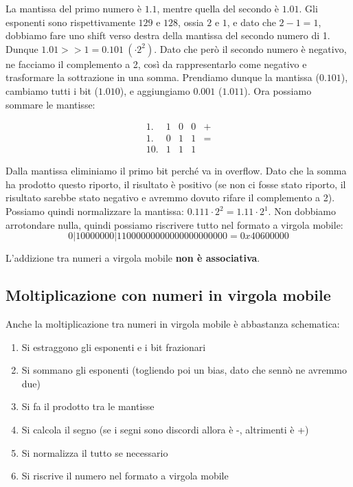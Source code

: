 \documentclass[11pt, a4paper, titlepage, oneside]{scrbook}
\begin{document}
La mantissa del primo numero è $1.1$, mentre quella del secondo è $1.01$. Gli esponenti sono rispettivamente $129$ e $128$, ossia $2$ e $1$, e dato che $2-1 = 1$, dobbiamo fare uno shift verso destra della mantissa del secondo numero di 1. Dunque $1.01 >> 1 =  0.101 \ (\cdot 2^2)$. Dato che però il secondo numero è negativo, ne facciamo il complemento a 2, così da rappresentarlo come negativo e trasformare la sottrazione in una somma. Prendiamo dunque la mantissa ($0.101$), cambiamo tutti i bit ($1.010$), e aggiungiamo $0.001$ ($1.011$). Ora possiamo sommare le mantisse:

\[
\begin{array}{rcccc}
1. & 1 & 0 & 0 & + \\
1. & 0 & 1 & 1 & = \\
\hline
1 0. & 1 & 1 & 1 &
\end{array}
\]

Dalla mantissa eliminiamo il primo bit perché va in overflow. Dato che la somma ha prodotto questo riporto, il risultato è positivo (se non ci fosse stato riporto, il risultato sarebbe stato negativo e avremmo dovuto rifare il complemento a 2). Possiamo quindi normalizzare la mantissa: $0.111 \cdot 2^2 = 1.11 \cdot 2^1$. Non dobbiamo arrotondare nulla, quindi possiamo riscrivere tutto nel formato a virgola mobile:
\[
0|10000000|11000000000000000000000 = 0x40600000
\]

\NB L'addizione tra numeri a virgola mobile \textbf{non è associativa}.

\subsection{Moltiplicazione con numeri in virgola mobile}

Anche la moltiplicazione tra numeri in virgola mobile è abbastanza schematica:
\begin{enumerate}[label=\arabic*°]
    \item Si estraggono gli esponenti e i bit frazionari
    \item Si sommano gli esponenti (togliendo poi un bias, dato che sennò ne avremmo due)
    \item Si fa il prodotto tra le mantisse
    \item Si calcola il segno (se i segni sono discordi allora è -, altrimenti è +)
    \item Si normalizza il tutto se necessario
    \item Si riscrive il numero nel formato a virgola mobile
\end{enumerate}
\end{document}
